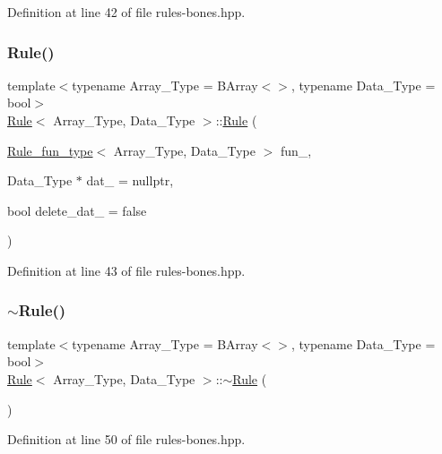 Definition at line 42 of file rules-\/bones.\+hpp.

\mbox{\label{class_rule_ad0b81db664bed03f9a381f90ab617424}} 
\subsubsection{\texorpdfstring{Rule()}{Rule()}\hspace{0.1cm}{\footnotesize\ttfamily [2/2]}}
{\footnotesize\ttfamily template$<$typename Array\+\_\+\+Type = B\+Array$<$$>$, typename Data\+\_\+\+Type = bool$>$ \\
\hyperlink{class_rule}{Rule}$<$ Array\+\_\+\+Type, Data\+\_\+\+Type $>$\+::\hyperlink{class_rule}{Rule} (\begin{DoxyParamCaption}\item[{\hyperlink{typedefs_8hpp_a99982bdca40c23ca6f901c8e66da78a1}{Rule\+\_\+fun\+\_\+type}$<$ Array\+\_\+\+Type, Data\+\_\+\+Type $>$}]{fun\+\_\+,  }\item[{Data\+\_\+\+Type $\ast$}]{dat\+\_\+ = {\ttfamily nullptr},  }\item[{bool}]{delete\+\_\+dat\+\_\+ = {\ttfamily false} }\end{DoxyParamCaption})\hspace{0.3cm}{\ttfamily [inline]}}



Definition at line 43 of file rules-\/bones.\+hpp.

\mbox{\label{class_rule_a9f7e4ac4893005c7d4ecc2781f0f727d}} 
\subsubsection{\texorpdfstring{$\sim$\+Rule()}{~Rule()}}
{\footnotesize\ttfamily template$<$typename Array\+\_\+\+Type = B\+Array$<$$>$, typename Data\+\_\+\+Type = bool$>$ \\
\hyperlink{class_rule}{Rule}$<$ Array\+\_\+\+Type, Data\+\_\+\+Type $>$\+::$\sim$\hyperlink{class_rule}{Rule} (\begin{DoxyParamCaption}{ }\end{DoxyParamCaption})\hspace{0.3cm}{\ttfamily [inline]}}



Definition at line 50 of file rules-\/bones.\+hpp.



